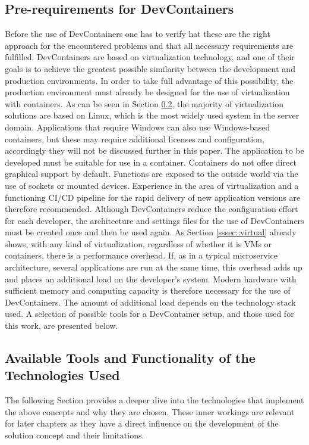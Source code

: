\documentclass[12pt, a4paper]{article}
\begin{document}
    \subsection{Pre-requirements for DevContainers}
    Before the use of DevContainers one has to verify hat these are the right approach for the encountered problems and that all necessary requirements are fulfilled.\newline
    DevContainers are based on virtualization technology, and one of their goals is to achieve the greatest possible similarity between the development and production environments. In order to take full advantage of this possibility, the production environment must already be designed for the use of virtualization with containers.  As can be seen in Section \ref{ssec::toolsused}, the majority of virtualization solutions are based on Linux, which is the most widely used system in the server domain. Applications that require Windows can also use Windows-based containers, but these may require additional licenses and configuration, accordingly they will not be discussed further in this paper. The application to be developed must be suitable for use in a container. Containers do not offer direct graphical support by default. Functions are exposed to the outside world via the use of sockets or mounted devices. Experience in the area of virtualization and a functioning \ac{CI}/\ac{CD} pipeline for the rapid delivery of new application versions are therefore recommended.\newline
    Although DevContainers reduce the configuration effort for each developer, the architecture and settings files for the use of DevContainers must be created once and then be used again. As Section \ref{sssec::virtual} already shows, with any kind of virtualization, regardless of whether it is VMs or containers, there is a performance overhead. If, as in a typical microservice architecture, several applications are run at the same time, this overhead adds up and places an additional load on the developer's system. Modern hardware with sufficient memory and computing capacity is therefore necessary for the use of DevContainers. The amount of additional load depends on the technology stack used. A selection of possible tools for a DevContainer setup, and those used for this work, are presented below.

    \subsection{Available Tools and Functionality of the Technologies Used}\label{ssec::toolsused}
    The following Section provides a deeper dive into the technologies that implement the above concepts and why they are chosen. These inner workings are relevant for later chapters as they have a direct influence on the development of the solution concept and their limitations.
\end{document}
